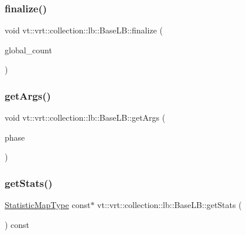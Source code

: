 \subsubsection{\texorpdfstring{finalize()}{finalize()}}
{\footnotesize\ttfamily void vt\+::vrt\+::collection\+::lb\+::\+Base\+L\+B\+::finalize (\begin{DoxyParamCaption}\item[{int32\+\_\+t}]{global\+\_\+count }\end{DoxyParamCaption})}

\mbox{\label{structvt_1_1vrt_1_1collection_1_1lb_1_1_base_l_b_a4ec045a3c6231d055b6e851de3016bba}} 
\subsubsection{\texorpdfstring{get\+Args()}{getArgs()}}
{\footnotesize\ttfamily void vt\+::vrt\+::collection\+::lb\+::\+Base\+L\+B\+::get\+Args (\begin{DoxyParamCaption}\item[{\hyperlink{namespacevt_a46ce6733d5cdbd735d561b7b4029f6d7}{Phase\+Type}}]{phase }\end{DoxyParamCaption})\hspace{0.3cm}{\ttfamily [protected]}}

\mbox{\label{structvt_1_1vrt_1_1collection_1_1lb_1_1_base_l_b_a8e3d3231dc49c55c1c494a5e5957baa1}} 
\subsubsection{\texorpdfstring{get\+Stats()}{getStats()}}
{\footnotesize\ttfamily \hyperlink{structvt_1_1vrt_1_1collection_1_1lb_1_1_base_l_b_acd9bdad961ac83c96b7a227de672f96c}{Statistic\+Map\+Type} const$\ast$ vt\+::vrt\+::collection\+::lb\+::\+Base\+L\+B\+::get\+Stats (\begin{DoxyParamCaption}{ }\end{DoxyParamCaption}) const\hspace{0.3cm}{\ttfamily [inline]}}

